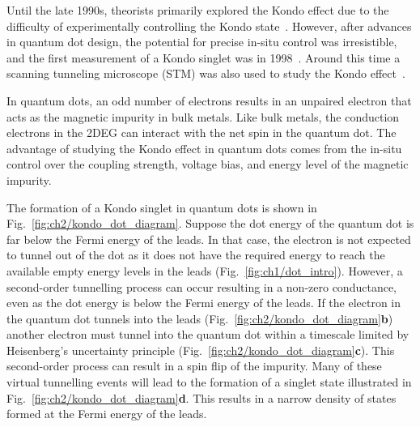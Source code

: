 Until the late 1990s, theorists primarily explored the Kondo effect due to the difficulty of experimentally controlling the Kondo state~\cite{still_irresistible,kondo_review}. However, after advances in quantum dot design, the potential for precise in-situ control was irresistible, and the first measurement of a Kondo singlet was in 1998~\cite{goldhaber_first_kondo}. Around this time a scanning tunneling microscope (STM) was also used to study the Kondo effect~\cite{stm_kondo}.

In quantum dots, an odd number of electrons results in an unpaired electron that acts as the magnetic impurity in bulk metals. Like bulk metals, the conduction electrons in the 2DEG can interact with the net spin in the quantum dot. The advantage of studying the Kondo effect in quantum dots comes from the in-situ control over the coupling strength, voltage bias, and energy level of the magnetic impurity.

The formation of a Kondo singlet in quantum dots is shown in Fig.~\ref{fig:ch2/kondo_dot_diagram}. 
Suppose the dot energy of the quantum dot is far below the Fermi energy of the leads. In that case, the electron is not expected to tunnel out of the dot as it does not have the required energy to reach the available empty energy levels in the leads (Fig.~\ref{fig:ch1/dot_intro}). However, a second-order tunnelling process can occur resulting in a non-zero conductance, even as the dot energy is below the Fermi energy of the leads. If the electron in the quantum dot tunnels into the leads (Fig.~\ref{fig:ch2/kondo_dot_diagram}\textbf{b}) another electron must tunnel into the quantum dot within a timescale limited by Heisenberg’s uncertainty principle (Fig.~\ref{fig:ch2/kondo_dot_diagram}\textbf{c}). This second-order process can result in a spin flip of the impurity. Many of these virtual tunnelling events will lead to the formation of a singlet state illustrated in Fig.~\ref{fig:ch2/kondo_dot_diagram}\textbf{d}. This results in a narrow density of states formed at the Fermi energy of the leads. 


